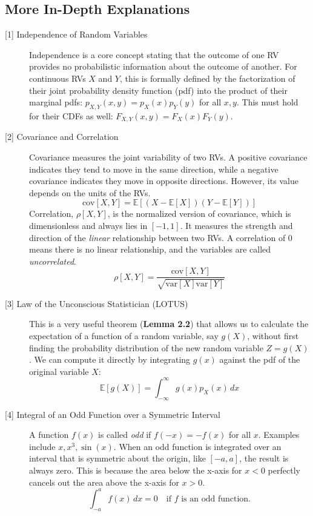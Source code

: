 \documentclass[11pt,a4paper]{article}
\begin{document}
\subsection*{More In-Depth Explanations}
\small
\begin{description}
    \item[\hypertarget{note1}{[1] Independence of Random Variables}] Independence is a core concept stating that the outcome of one RV provides no probabilistic information about the outcome of another. For continuous RVs $X$ and $Y$, this is formally defined by the factorization of their joint probability density function (pdf) into the product of their marginal pdfs: $p_{X,Y}(x,y) = p_X(x)p_Y(y)$ for all $x, y$. This must hold for their CDFs as well: $F_{X,Y}(x,y) = F_X(x)F_Y(y)$.

    \item[\hypertarget{note2}{[2] Covariance and Correlation}] Covariance measures the joint variability of two RVs. A positive covariance indicates they tend to move in the same direction, while a negative covariance indicates they move in opposite directions. However, its value depends on the units of the RVs.
    \begin{equation*}
        \text{cov}[X, Y] = \mathbb{E}[(X - \mathbb{E}[X])(Y - \mathbb{E}[Y])]
    \end{equation*}
    Correlation, $\rho[X,Y]$, is the normalized version of covariance, which is dimensionless and always lies in $[-1, 1]$. It measures the strength and direction of the \emph{linear} relationship between two RVs. A correlation of 0 means there is no linear relationship, and the variables are called \emph{uncorrelated}.
    \begin{equation*}
        \rho[X, Y] = \frac{\text{cov}[X, Y]}{\sqrt{\text{var}[X]\text{var}[Y]}}
    \end{equation*}

    \item[\hypertarget{note3}{[3] Law of the Unconscious Statistician (LOTUS)}] This is a very useful theorem (\textbf{Lemma 2.2}) that allows us to calculate the expectation of a function of a random variable, say $g(X)$, without first finding the probability distribution of the new random variable $Z=g(X)$. We can compute it directly by integrating $g(x)$ against the pdf of the original variable $X$:
    \begin{equation*} \mathbb{E}[g(X)] = \int_{-\infty}^{\infty} g(x)p_X(x)\,dx \end{equation*}

    \item[\hypertarget{note4}{[4] Integral of an Odd Function over a Symmetric Interval}] A function $f(x)$ is called \emph{odd} if $f(-x) = -f(x)$ for all $x$. Examples include $x, x^3, \sin(x)$. When an odd function is integrated over an interval that is symmetric about the origin, like $[-a, a]$, the result is always zero. This is because the area below the x-axis for $x<0$ perfectly cancels out the area above the x-axis for $x>0$.
    \begin{equation*} \int_{-a}^{a} f(x)\,dx = 0 \quad \text{if } f \text{ is an odd function.} \end{equation*}
\end{description}
\end{document}
